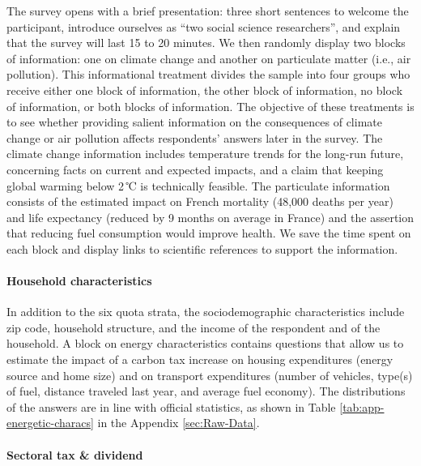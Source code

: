 \documentclass[12pt]{article} %
\begin{document}
The survey opens with a brief presentation: three short sentences to welcome the participant, introduce ourselves as ``two social science researchers'', and explain that the survey will last 15 to 20 minutes. We then randomly display two blocks of information: one on climate change and another on particulate matter (i.e., air pollution). This informational treatment divides the sample into four groups who receive either one block of information, the other block of information, no block of information, or both blocks of information. The objective of these treatments is to see whether providing salient information on the consequences of climate change or air pollution affects respondents' answers later in the survey. The climate change information includes temperature trends for the long-run future, concerning facts on current and expected impacts, and a claim that keeping global warming below 2\,℃ is technically feasible. The particulate information consists of the estimated impact on French mortality (48,000 deaths per year) and life expectancy (reduced by 9 months on average in France) and the assertion that reducing fuel consumption would improve health. We save the time spent on each block and display links to scientific references to support the information.

\paragraph{Household characteristics}
In addition to the six quota strata, the sociodemographic characteristics include zip code, household structure, and the income of the respondent and of the household. A block on energy characteristics contains questions that allow us to estimate the impact of a carbon tax increase on housing expenditures (energy source and home size) and on transport expenditures (number of vehicles, type(s) of fuel, distance traveled last year, and average fuel economy). The distributions of the answers are in line with official statistics, as shown in Table \ref{tab:app-energetic-characs} in the Appendix \ref{sec:Raw-Data}.

\paragraph{Sectoral tax \& dividend} %
\end{document}
